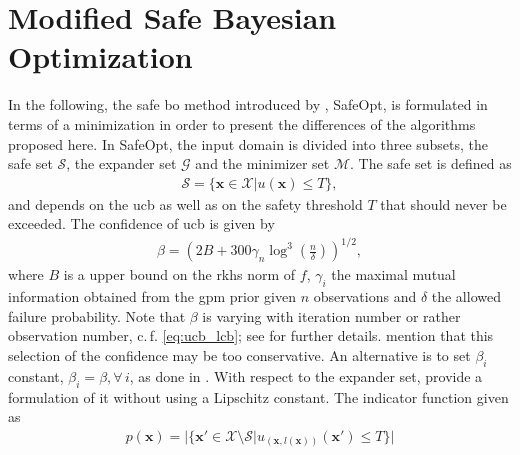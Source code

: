 \documentclass{ifacconf}
\newcommand{\cf}{c.\,f. }
\newcommand{\bx}{\bm{x}}
\begin{document}
\section{Modified Safe Bayesian Optimization} \label{sec:safeBO}
In the following, the safe \gls{bo} method introduced by \cite{safeoptberkenkamp}, SafeOpt, is formulated in terms of a minimization in order to present the differences of the algorithms proposed here. In SafeOpt, the input domain is divided into three subsets, the safe set \(\mathcal{S}\), the expander set \(\mathcal{G}\) and the minimizer set \(\mathcal{M}\). 
The safe set is defined as
\begin{align}
    \mathcal{S} = \{\bm{x}\in \mathcal{X}\lvert u(\bx) \leq T\},
    \label{eq:safeset_berk}
\end{align}
 and depends on the \gls{ucb} as well as on the safety threshold \(T\) that should never be exceeded. The confidence of \gls{ucb} is given by
 \begin{align*}
    \beta = \left(2B+300\gamma_n\log^3\left(\frac{n}{\delta}\right)\right)^{1/2},
\end{align*} 
where \(B\) is a upper bound on the \gls{rkhs} norm of \(f\), \(\gamma_i\) the maximal mutual information obtained from the \gls{gpm} prior given \(n\) observations and \(\delta\) the allowed failure probability. Note that \(\beta\) is varying with iteration number or rather observation number, \cf \eqref{eq:ucb_lcb}; see \cite{safeopt1} for further details.
\cite{safeopt2} mention that this selection of the confidence may be too conservative. An alternative is to set \(\beta_i\) constant, \(\beta_i = \beta , \forall\, i\), as done in \cite{safeoptberkenkamp}. With respect to the expander set, \cite{safeoptberkenkamp} provide a formulation of it without using a Lipschitz constant. The indicator function given as
\begin{align}
    p(\bm{x}) = \lvert\{\bm{x}'\in \mathcal{X}\setminus \mathcal{S}\lvert u_{(\bm{x},l(\bm{x}))}(\bm{x}')\leq T\}\rvert
\end{align}
\end{document}
